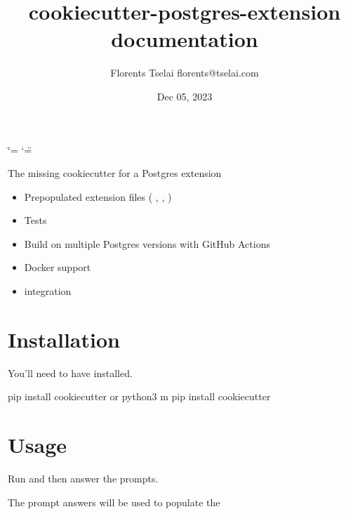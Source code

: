 \documentclass[letterpaper,10pt,english]{sphinxmanual}
\title{cookiecutter-postgres-extension documentation}
\date{Dec 05, 2023}
\author{Florents Tselai 
 florents@tselai.com}
\begin{document}
\ifdefined\shorthandoff
  \ifnum\catcode`\=\string=\active\shorthandoff{=}\fi
  \ifnum\catcode`\"=\active{}\fi
\fi

\pagestyle{empty}
\sphinxmaketitle
\pagestyle{plain}
\sphinxtableofcontents
\pagestyle{normal}
\label{\detokenize{index::doc}}


\sphinxAtStartPar
The missing cookiecutter for a Postgres extension
\begin{itemize}
\item {} 
\sphinxAtStartPar
Pre\sphinxhyphen{}populated extension files (  , , )

\item {} 
\sphinxAtStartPar
Tests

\item {} 
\sphinxAtStartPar
Build on multiple Postgres versions with GitHub Actions

\item {} 
\sphinxAtStartPar
Docker support

\item {} 
\sphinxAtStartPar
{} integration

\end{itemize}


\chapter{Installation}
\label{\detokenize{index:installation}}
\sphinxAtStartPar
You’ll need to have  installed.

\begin{sphinxVerbatim}[commandchars=\\\{\}]
pip install cookiecutter
or
python3 \PYGZhy{}m pip install cookiecutter
\end{sphinxVerbatim}


\chapter{Usage}
\label{\detokenize{index:usage}}
\sphinxAtStartPar
Run  and then
answer the prompts.

\sphinxAtStartPar
The prompt answers will be used to populate the 



\renewcommand{\indexname}{Index}
\printindex
\end{document}
